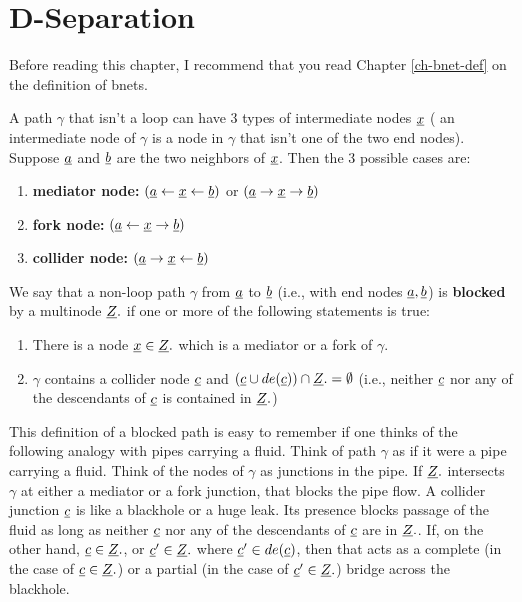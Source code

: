 \chapter{D-Separation}
\label{chap-dsep}
Before reading this chapter,
I  recommend
that you
read
Chapter \ref{ch-bnet-def}
on the definition of bnets.


A path $\gamma$ that
isn't a loop can have 
3 types of intermediate nodes ${\underline{x}}$ (
an intermediate node of $\gamma$
 is a node in $\gamma$ that 
isn't one
of the two end nodes).
Suppose ${\underline{a}}$ and ${\underline{b}}$
are the two neighbors of ${\underline{x}}$. Then
the 3 possible cases are:
\begin{enumerate}
\item {\bf mediator node:}
$({\underline{a}}\leftarrow{\underline{x}}\leftarrow {\underline{b}})$
or
$({\underline{a}}\rightarrow{\underline{x}}\rightarrow {\underline{b}})$
\item {\bf fork node:}
$({\underline{a}}\leftarrow{\underline{x}}\rightarrow {\underline{b}})$
\item {\bf collider node:}
$({\underline{a}}\rightarrow{\underline{x}}\leftarrow {\underline{b}})$
\end{enumerate}

We say that a non-loop path 
$\gamma$ 
from ${\underline{a}}$ to ${\underline{b}}$ (i.e., with
end nodes ${\underline{a}}, {\underline{b}}$)
is {\bf blocked} 
by a multinode ${\underline{Z}}.$
if one or more 
of the following
statements is true:

\begin{enumerate}
\item 
There is a node ${\underline{x}}\in {\underline{Z}}.$
which is a mediator 
or a fork of $\gamma$.
\item
$\gamma$ contains a collider
node ${\underline{c}}$
and 
$({\underline{c}}\cup de({\underline{c}}))\cap{\underline{Z}}.=\emptyset$
(i.e., neither 
${\underline{c}}$ nor 
any of the descendants of ${\underline{c}}$
is contained in ${\underline{Z}}.$)
\end{enumerate}

This definition of a blocked 
path is easy to remember
if one thinks 
of the following analogy
with pipes carrying a fluid.
Think of path
$\gamma$ as if it
were a pipe
carrying a fluid.
Think of
the nodes 
of $\gamma$ as junctions in the pipe.
If ${\underline{Z}}.$
intersects $\gamma$
at either a mediator
or a fork junction,
that blocks the pipe flow.
A collider junction ${\underline{c}}$
is like a blackhole 
or a huge leak.
Its presence
blocks passage
of the fluid
as long
as neither
${\underline{c}}$
nor any of
the descendants 
of ${\underline{c}}$
are in ${\underline{Z}}.$.
If,
on the 
other hand,
${\underline{c}}\in{\underline{Z}}.$,
or ${\underline{c}}'\in {\underline{Z}}.$
where ${\underline{c}}'\in de({\underline{c}})$,
then
that acts
as a complete
(in the case of ${\underline{c}}\in{\underline{Z}}.$)
or a partial 
(in the case of ${\underline{c}}'\in{\underline{Z}}.$)
bridge across the blackhole.

